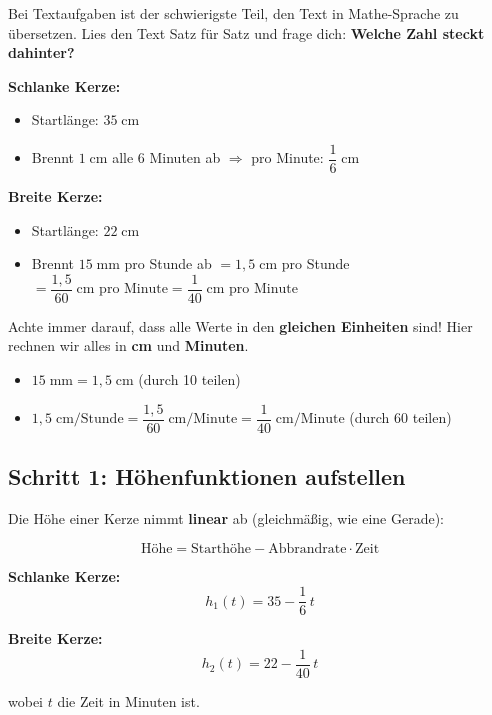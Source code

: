 \documentclass[12pt,a4paper]{article}
\begin{document}
\begin{analogie}
Bei Textaufgaben ist der schwierigste Teil, den Text in Mathe-Sprache zu \"ubersetzen. Lies den Text Satz f\"ur Satz und frage dich: \textbf{Welche Zahl steckt dahinter?}
\end{analogie}

\textbf{Schlanke Kerze:}
\begin{itemize}
  \item Startl\"ange: $35\;\text{cm}$
  \item Brennt $1\;\text{cm}$ alle $6$ Minuten ab $\Rightarrow$ pro Minute: $\dfrac{1}{6}\;\text{cm}$
\end{itemize}

\textbf{Breite Kerze:}
\begin{itemize}
  \item Startl\"ange: $22\;\text{cm}$
  \item Brennt $15\;\text{mm}$ pro Stunde ab $= 1{,}5\;\text{cm}$ pro Stunde $= \dfrac{1{,}5}{60}\;\text{cm pro Minute} = \dfrac{1}{40}\;\text{cm pro Minute}$
\end{itemize}

\begin{merkbox}[title={Einheiten umrechnen!}]
Achte immer darauf, dass alle Werte in den \textbf{gleichen Einheiten} sind! Hier rechnen wir alles in \textbf{cm} und \textbf{Minuten}.
\begin{itemize}
  \item $15\;\text{mm} = 1{,}5\;\text{cm}$ \quad (durch 10 teilen)
  \item $1{,}5\;\text{cm/Stunde} = \dfrac{1{,}5}{60}\;\text{cm/Minute} = \dfrac{1}{40}\;\text{cm/Minute}$ \quad (durch 60 teilen)
\end{itemize}
\end{merkbox}

\subsection{Schritt 1: H\"ohenfunktionen aufstellen}

Die H\"ohe einer Kerze nimmt \textbf{linear} ab (gleichm\"a\ss ig, wie eine Gerade):

\[
  \text{H\"ohe} = \text{Starth\"ohe} - \text{Abbrandrate} \cdot \text{Zeit}
\]

\textbf{Schlanke Kerze:}
\[
  h_1(t) = 35 - \frac{1}{6}\,t
\]

\textbf{Breite Kerze:}
\[
  h_2(t) = 22 - \frac{1}{40}\,t
\]

wobei $t$ die Zeit in Minuten ist.
\end{document}
